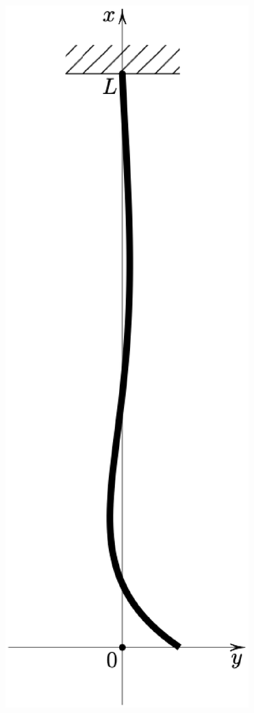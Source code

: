 \begin{figure}[H]
    \centering
    \includegraphics[scale=0.5]{Imagenes/Cadena_Oscilante_05_png.eps}
\end{figure}

